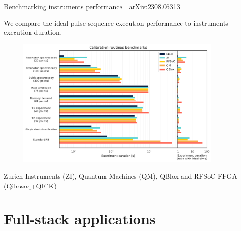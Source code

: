 \documentclass[aspectratio=169, 10pt, xcolor={svgnames}, hyperref={linkcolor=black}]{beamer}
\begin{document}
 \begin{frame}{Benchmarking instruments performance \hfill \faBook\,\, \href{https://arxiv.org/abs/2308.06313}{arXiv:2308.06313}}

   We compare the ideal pulse sequence execution performance to instruments execution duration.
   \vspace{-0.5cm}
   \begin{figure}
     \includegraphics[height=6.5cm]{figures/routines.pdf}
   \end{figure}
   \vspace{-0.5cm}
   \begin{center}
     \small
     Zurich Instruments (ZI), Quantum Machines
     (QM), QBlox and RFSoC FPGA (Qibosoq+QICK).
   \end{center}

 \end{frame}

\section{Full-stack applications}
\end{document}
